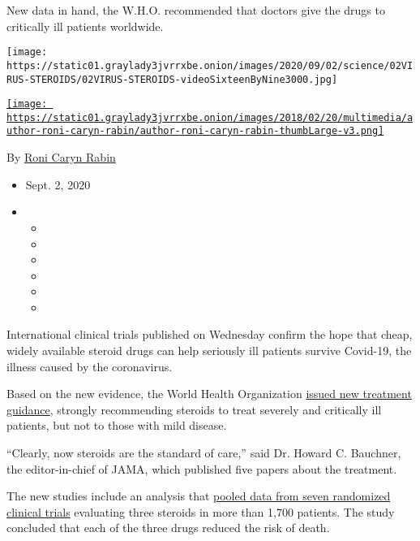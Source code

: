 New data in hand, the W.H.O. recommended that doctors give the drugs to
critically ill patients worldwide.

\texttt{[image: https://static01.graylady3jvrrxbe.onion/images/2020/09/02/science/02VIRUS-STEROIDS/02VIRUS-STEROIDS-videoSixteenByNine3000.jpg]}

\href{https://www.nytimes3xbfgragh.onion/by/roni-caryn-rabin}{\texttt{[image: https://static01.graylady3jvrrxbe.onion/images/2018/02/20/multimedia/author-roni-caryn-rabin/author-roni-caryn-rabin-thumbLarge-v3.png]}}

By \href{https://www.nytimes3xbfgragh.onion/by/roni-caryn-rabin}{Roni
Caryn Rabin}

\begin{itemize}
\item
  Sept. 2, 2020
\item
  \begin{itemize}
  \item
  \item
  \item
  \item
  \item
  \item
  \end{itemize}
\end{itemize}

International clinical trials published on Wednesday confirm the hope
that cheap, widely available steroid drugs can help seriously ill
patients survive Covid-19, the illness caused by the coronavirus.

Based on the new evidence, the World Health Organization
\href{https://www.who.int/publications/i/item/WHO-2019-nCoV-Corticosteroids-2020.1}{issued
new treatment guidance}, strongly recommending steroids to treat
severely and critically ill patients, but not to those with mild
disease.

``Clearly, now steroids are the standard of care,'' said Dr. Howard C.
Bauchner, the editor-in-chief of JAMA, which published five papers about
the treatment.

The new studies include an analysis that
\href{https://jamanetwork.com/journals/jama/fullarticle/10.1001/jama.2020.17023?guestAccessKey=ec87204d-c42d-4d34-bef5-077a40bc86b0\&utm_source=For_The_Media\&utm_medium=referral\&utm_campaign=ftm_links\&utm_content=tfl\&utm_term=090220}{pooled
data from seven randomized clinical trials} evaluating three steroids in
more than 1,700 patients. The study concluded that each of the three
drugs reduced the risk of death.

